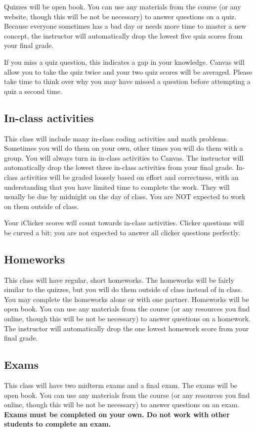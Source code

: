 \documentclass[10pt]{memoir}
\begin{document}
Quizzes will be open book. You can use any materials from the course (or any website, though this will be not be necessary) to answer questions on a quiz. Because everyone sometimes has a bad day or needs more time to master a new concept, the instructor will automatically drop the lowest five quiz scores from your final grade. 

If you miss a quiz question, this indicates a gap in your knowledge. Canvas will allow you to take the quiz twice and your two quiz scores will be averaged. Please take time to think over why you may have missed a question before attempting a quiz a second time.


\subsection{\textbf{In-class activities}}
This class will include many in-class coding activities and math problems. 
Sometimes you will do them on your own, other times you will do them with a group. 
You will always turn in in-class activities to Canvas. 
The instructor will automatically drop the lowest three in-class activities from your final grade. In-class activities will be graded loosely based on effort and correctness, with an understanding that you have limited time to complete the work. They will usually be due by midnight on the day of class. You are NOT expected to work on them outside of class.

Your iClicker scores will count towards in-class activities. Clicker questions will be curved a bit; you are not expected to answer all clicker questions perfectly.

\subsection{\textbf{Homeworks}}
This class will have regular, short homeworks. The homeworks will be fairly similar to the quizzes, but you will do them outside of class instead of in class. You may complete the homeworks alone or with one partner. Homeworks will be open book. You can use any materials from the course (or any resources you find online, though this will be not be necessary) to answer questions on a homework. The instructor will automatically drop the one lowest homework score from your final grade.

\subsection{\textbf{Exams}}
This class will have two midterm exams and a final exam. The exams will be open book. You can use any materials from the course (or any resources you find online, though this will be not be necessary) to answer questions on an exam. \textbf{Exams must be completed on your own. Do not work with other students to complete an exam.}
\end{document}
